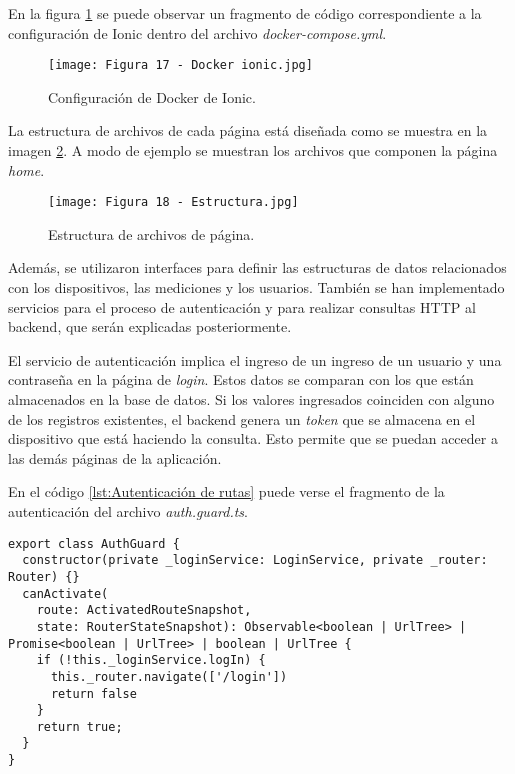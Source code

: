 En la figura \ref{fig:17} se puede observar un fragmento de código correspondiente a la configuración de Ionic dentro del archivo \textit{docker-compose.yml}.

\begin{figure}[h]
\centering
\texttt{[image: Figura 17 - Docker ionic.jpg]}
\caption[Configuración Ionic]{Configuración de Docker de Ionic.}
\label{fig:17}
\end{figure}

La estructura de archivos de cada página está diseñada como se muestra en la imagen \ref{fig:18}. A modo de ejemplo se muestran los archivos que componen la página \textit{home}.

\newpage
\begin{figure}[h]
\centering
\texttt{[image: Figura 18 - Estructura.jpg]}
\caption[Estructura página]{Estructura de archivos de página.}
\label{fig:18}
\end{figure}

Además, se utilizaron interfaces para definir las estructuras de datos relacionados con los dispositivos, las mediciones y los usuarios. También se han implementado servicios para el proceso de autenticación y para realizar consultas HTTP al backend, que serán explicadas posteriormente.

El servicio de autenticación implica el ingreso de un ingreso de un usuario y una contraseña en la página de \textit{login}. Estos datos se comparan con los que están almacenados en la base de datos. Si los valores ingresados coinciden con alguno de los registros existentes, el backend genera un \textit{token} que se almacena en el dispositivo que está haciendo la consulta. Esto permite que se puedan acceder a las demás páginas de la aplicación.

En el código \ref{lst:Autenticación de rutas} puede verse el fragmento de la autenticación del archivo \textit{auth.guard.ts}.



\begin{lstlisting}[caption={Autenticación de rutas.}, label={lst:Autenticación de rutas}]
export class AuthGuard {
  constructor(private _loginService: LoginService, private _router: Router) {}
  canActivate(
    route: ActivatedRouteSnapshot,
    state: RouterStateSnapshot): Observable<boolean | UrlTree> | Promise<boolean | UrlTree> | boolean | UrlTree {
    if (!this._loginService.logIn) {
      this._router.navigate(['/login'])
      return false
    }
    return true;
  }
}
\end{lstlisting}


